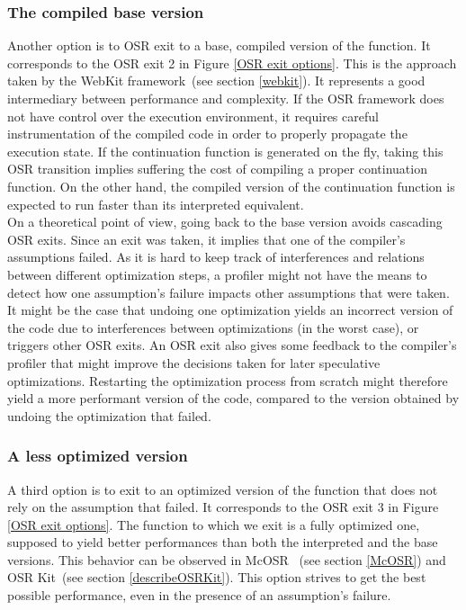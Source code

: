 \subsubsection{The compiled base version}
Another option is to OSR exit to a base, compiled version of the function.
It corresponds to the OSR exit 2 in Figure \ref{OSR exit options}.
This is the approach taken by the WebKit framework~\cite{WebKitURL}(see section \ref{webkit}).
It represents a good intermediary between performance and complexity.
If the OSR framework does not have control over the execution environment, it requires careful instrumentation of the compiled code in order to properly propagate the execution state.
If the continuation function is generated on the fly, taking this OSR transition implies suffering the cost of compiling a proper continuation function.
On the other hand, the compiled version of the continuation function is expected to run faster than its interpreted equivalent.\\

On a theoretical point of view, going back to the base version avoids cascading OSR exits.
Since an exit was taken, it implies that one of the compiler's assumptions failed.
As it is hard to keep track of interferences and relations between different optimization steps, a profiler might not have the means to detect how one assumption's failure impacts other assumptions that were taken.
It might be the case that undoing one optimization yields an incorrect version of the code due to interferences between optimizations (in the worst case), or triggers other OSR exits.
An OSR exit also gives some feedback to the compiler's profiler that might improve the decisions taken for later speculative optimizations.
Restarting the optimization process from scratch might therefore yield a more performant version of the code, compared to the version obtained by undoing the optimization that failed.\\

\subsubsection{A less optimized version}
A third option is to exit to an optimized version of the function that does not rely on the assumption that failed.
It corresponds to the OSR exit 3 in Figure \ref{OSR exit options}.
The function to which we exit is a fully optimized one, supposed to yield better performances than both the interpreted and the base versions.
This behavior can be observed in McOSR~\cite{lameed2013modular} (see section \ref{McOSR}) and OSR Kit~\cite{OSRKit}(see section \ref{describeOSRKit}).
This option strives to get the best possible performance, even in the presence of an assumption's failure.\\

